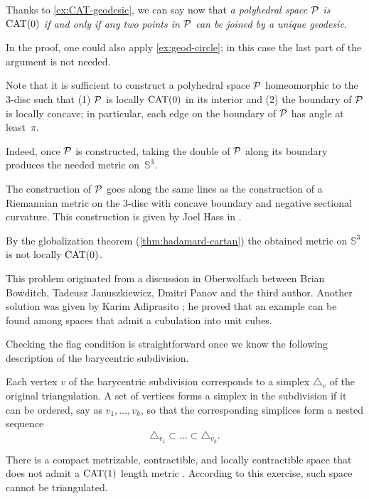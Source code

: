 Thanks to \ref{ex:CAT-geodesic}, we can say now that \textit{a polyhedral space $\mathcal{P}$ is $\mathrm{CAT}(0)$ if and only if any two points in $\mathcal{P}$ can be joined by a unique geodesic}.

In the proof, one could also apply \ref{ex:geod-circle};
in this case the last part of the argument is not needed.

Note that it is sufficient to construct a polyhedral space $\mathcal{P}$ homeomorphic to the 3-disc such that (1) $\mathcal{P}$ is locally $\mathrm{CAT}(0)$ in its interior and (2) the boundary of $\mathcal{P}$ is locally concave; in particular, each edge on the boundary of $\mathcal{P}$ has angle at least~$\pi$.

Indeed, once $\mathcal{P}$ is constructed, taking the double of $\mathcal{P}$ along its boundary produces the needed metric on~$\mathbb{S}^3$.

The construction of $\mathcal{P}$ goes along the same lines as the construction of a Riemannian metric on the 3-disc with concave boundary and negative sectional curvature. 
This construction is given by Joel Hass in \cite{hass}.

 By the globalization theorem (\ref{thm:hadamard-cartan}) the obtained metric on $\mathbb{S}^3$ is not locally $\mathrm{CAT}(0)$.

This problem originated from a discussion 
in Oberwolfach
between
Brian Bowditch,
Tadeusz Januszkiewicz,
Dmitri Panov
and 
the third author.
Another solution was given by Karim Adiprasito \cite{adiprasito};
he proved that an example can be found among spaces that admit a cubulation into unit cubes.



Checking the flag condition is straightforward once we know the following description of the barycentric subdivision.

Each vertex $v$ of the barycentric subdivision 
corresponds to a simplex $\triangle_v$ of the original triangulation.
A set of vertices forms a simplex in the subdivision 
if it can be ordered, say as $v_1,\ldots,v_k$,
so that the corresponding simplices form a nested sequence
\[\triangle_{v_1}\subset\ldots\subset\triangle_{v_k}.\]

There is a compact metrizable, contractible, and locally contractible space that does not admit a $\mathrm{CAT}(1)$ length metric \cite{petrunin-2024}.
According to this exercise, such space cannot be triangulated. 

